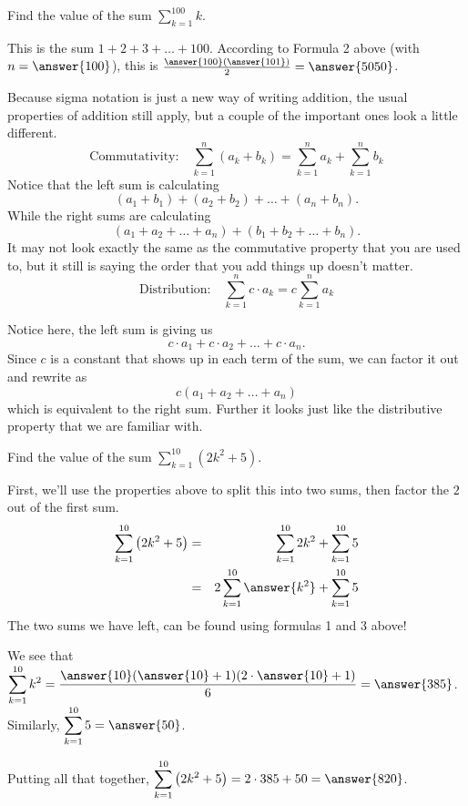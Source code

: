 \documentclass{ximera}
\begin{document}
\begin{example}
	Find the value of the sum $\displaystyle \sum_{k=1}^{100} k$.
	\begin{explanation}
		This is the sum $1+2+3+ \ldots + 100$.  According to Formula 2 above (with $n=\answer{100}$), this is $\frac{\answer{100}(\answer{101})}{2} = \answer{5050}$.	
	\end{explanation}
\end{example}

 

 Because sigma notation is just a new way of writing addition, the usual properties of addition still apply, but a couple of the important ones look a little different.
\[ \text{Commutativity:} \quad \sum_{k=1}^{n} (a_k + b_k) = \sum_{k=1}^n a_k + \sum_{k=1}^n b_k \]
Notice that the left sum is calculating 
\[(a_1+b_1)+(a_2+b_2)+\dots+(a_n+b_n).\]
While the right sums are calculating
\[(a_1+a_2+\dots + a_n)+(b_1+b_2+\dots+b_n).\]
It may not look exactly the same as the commutative property that you are used to, but it still is saying the order that you add things up doesn't matter.
\[ \text{Distribution:}  \quad \sum_{k=1}^{n} c \cdot a_k = c \sum_{k=1}^n a_k \]

Notice here, the left sum is giving us 
\[c\cdot a_1+c\cdot a_2+\dots +c\cdot a_n.\] 
Since $c$ is a constant that shows up in each term of the sum, we can factor it out and rewrite as 
\[c(a_1+a_2+\dots +a_n)\]
which is equivalent to the right sum. Further it looks just like the distributive property that we are familiar with.
\begin{example}
	Find the value of the sum $\displaystyle \sum_{k=1}^{10} \left(2k^2+5\right)$.
	\begin{explanation}
		First, we'll use the properties above to split this into two sums, then factor the $2$ out of the first sum.
		\begin{eqnarray*}
			\sum_{k=1}^{10} \left(2k^2+5\right) &=& \sum_{k=1}^{10} 2k^2 + \sum_{k=1}^{10} 5\\
				&=& 2 \sum_{k=1}^{10} \answer{k^2} + \sum_{k=1}^{10} 5
		\end{eqnarray*}
		The two sums we have left, can be found using formulas 1 and 3 above!
		
		 We see that $\displaystyle \sum_{k=1}^{10} k^2 = \frac{\answer{10}(\answer{10}+1)(2\cdot \answer{10}+1)}{6} = \answer{385}$.  Similarly, $\displaystyle \sum_{k=1}^{10} 5 = \answer{50}$.
		
		 Putting all that together, $\displaystyle \sum_{k=1}^{10}\left(2k^2+5\right) = 2 \cdot 385 + 50 = \answer{820}$.
	\end{explanation}
\end{example}
 
\end{document}
